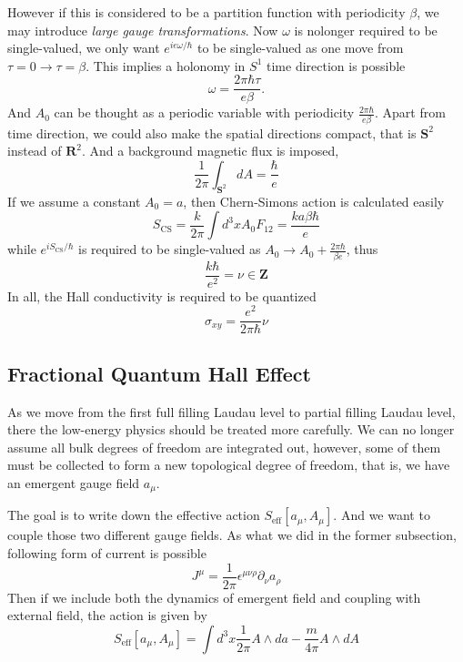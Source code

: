 \documentclass[12pt,a4paper]{article}
\numberwithin{equation}{section}
\begin{document}
However if this is considered to be a partition function with periodicity $\beta$, we may introduce \textit{large gauge transformations}.
Now $\omega$ is nolonger required to be single-valued, we only want $e^{ie\omega/\hbar}$ to be single-valued as one move from $\tau=0\to\tau=\beta$.
This implies a holonomy in $S^1$ time direction is possible
\begin{equation}
    \omega = \frac{2\pi\hbar\tau}{e\beta}.
\end{equation}
And $A_0$ can be thought as a periodic variable with periodicity $\frac{2\pi\hbar}{e\beta}$.
Apart from time direction, we could also make the spatial directions compact, that is $\mathbf{S}^2$ instead of $\mathbf{R}^2$. And a background magnetic flux is imposed,
\begin{equation}
    \frac{1}{2\pi}\int_{\mathbf{S}^2}dA = \frac{\hbar}{e}
\end{equation}
If we assume a constant $A_0=a$, then Chern-Simons action is calculated easily
\begin{equation}
    S_{\text{CS}} = \frac{k}{2\pi} \int d^3x A_0F_{12} = \frac{ka\beta\hbar}{e}
\end{equation}
while $e^{iS_{\text{CS}}/\hbar}$ is required to be single-valued as $A_0\to A_0+ \frac{2\pi\hbar}{\beta e}$, thus
\begin{equation}
    \frac{k\hbar}{e^2} = \nu\in \mathbf{Z}
\end{equation}
In all, the Hall conductivity is required to be quantized
\begin{equation}
    \sigma_{xy} = \frac{e^2}{2\pi\hbar}\nu
\end{equation}


\subsection{Fractional Quantum Hall Effect}
As we move from the first full filling Laudau level to partial filling Laudau level, there the low-energy physics should be treated more carefully.
We can no longer assume all bulk degrees of freedom are integrated out, however, some of them must be collected to form a new topological degree of freedom, that
is, we have an emergent gauge field $a_\mu$.

The goal is to write down the effective action $S_{\text{eff}}[a_\mu,A_\mu]$. And we want to couple those two different gauge fields.
As what we did in the former subsection, following form of current is possible 
\begin{equation}
    J^\mu = \frac{1}{2\pi} \epsilon^{\mu\nu\rho}\partial_\nu a_{\rho}
\end{equation}
Then if we include both the dynamics of emergent field and coupling with external field, the action is given by
\begin{equation}
    S_{\text{eff}}[a_\mu,A_\mu] = \int d^3x \frac{1}{2\pi}A\wedge da - \frac{m}{4\pi} A\wedge dA
\end{equation}
\end{document}
